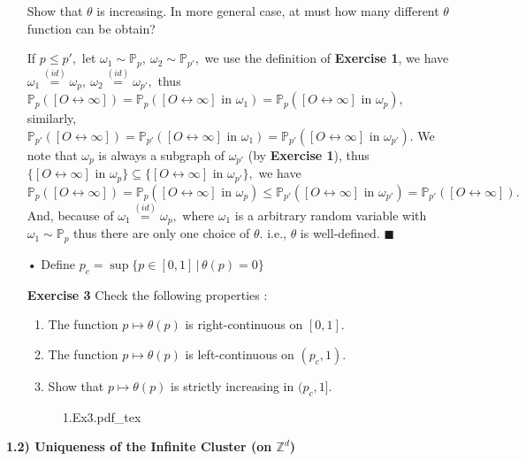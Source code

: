 \documentclass[12pt,a4paper]{article}
\newcommand{\SOL}{\fbox{ \tt s\parbox[b][2pt][c]{6pt}{o}\hspace*{-7pt} L:}}
\newcommand{\incfig}[1]{%
{#1.pdf_tex}
}
\begin{document}
\begin{enumerate}
	Show that $\theta$ is increasing. In more general case, at must how many different $\theta$ function can be obtain?
	\item[\SOL] If $p\leq p',$ let $\omega_1\sim \mathbb{P}_p,\ \omega_2\sim \mathbb{P}_{p'},$ we use the definition of \textbf{Exercise 1}, we have\\ $\omega_1\overset{(id)}{=}\omega_p,\ \omega_2\overset{(id)}{=}\omega_{p'},$ thus $\mathbb{P}_p([O\leftrightarrow\infty])=\mathbb{P}_p([O\leftrightarrow\infty]\mbox{ in }\omega_1)=\mathbb{P}_p([O\leftrightarrow\infty]\mbox{ in }\omega_p),$ 
	\newpage
	similarly, $\mathbb{P}_{p'}([O\leftrightarrow\infty])=\mathbb{P}_{p'}([O\leftrightarrow\infty]\mbox{ in }\omega_1)=\mathbb{P}_{p'}([O\leftrightarrow\infty]\mbox{ in }\omega_{p'}).$ We note that $\omega_p$ is always a subgraph of $\omega_{p'}$ (by \textbf{Exercise 1}), thus $\{[O\leftrightarrow\infty]\mbox{ in }\omega_p\}\subseteq\{[O\leftrightarrow\infty]\mbox{ in }\omega_{p'}\},$ we have $\mathbb{P}_p([O\leftrightarrow\infty])=\mathbb{P}_p([O\leftrightarrow\infty]\mbox{ in }\omega_p)\leq \mathbb{P}_{p'}([O\leftrightarrow\infty]\mbox{ in }\omega_{p'})=\mathbb{P}_{p'}([O\leftrightarrow\infty]).$\\
	And, because of $\omega_1\overset{(id)}{=}\omega_p,$ where $\omega_1$ is a arbitrary random variable with $\omega_1\sim\mathbb{P}_p$ thus there are only one choice of $\theta.$ i.e., $\theta$ is well-defined. $\blacksquare$
	\item[•] Define $p_c=\sup\{p\in [0,1]\,|\,\theta(p)=0\}$
	\item[\textbf{Exercise 3}] Check the following properties : 
	\begin{enumerate}
		\item The function $p\mapsto\theta(p)$ is right-continuous on $[0,1].$
		\item The function $p\mapsto\theta(p)$ is left-continuous on $(p_c,1).$
		\item Show that $p\mapsto \theta(p)$ is strictly increasing in $(p_c,1].$
	\end{enumerate}
	\begin{figure}[htp]
	\centering
	\def\svgwidth{12cm}
	\incfig{1.Ex3}
	\end{figure}
\end{enumerate}
\newpage
\begin{flushleft}
	\Large \textbf{1.2) Uniqueness of the Infinite Cluster (on $\mathbb{Z}^d$)}
\end{flushleft}
\end{document}
